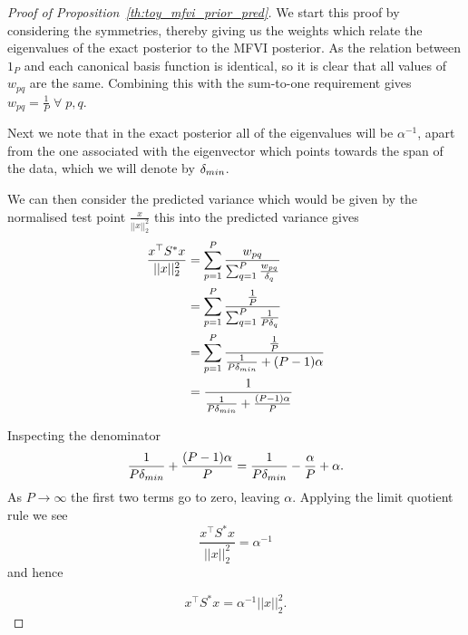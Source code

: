 \begin{proof}[Proof of Proposition~\ref{th:toy_mfvi_prior_pred}]
    
    We start this proof by considering the symmetries,  thereby giving us the weights which relate the eigenvalues of the exact posterior to the MFVI posterior. 
    As the relation between $1_P$ and each canonical basis function is identical, so it is clear that all values of $w_{pq}$ are the same. Combining this with the sum-to-one requirement gives $w_{pq} = \frac{1}{P} \; \forall \; p, q $. 

    Next we note that in the exact posterior all of the eigenvalues will be $\alpha^{-1}$, apart from the one associated with the eigenvector which points towards the span of the data, which we will denote by $\delta_{min}$. 

    We can then consider the predicted variance which would be given by the normalised test point $\frac{x}{||x||_2^2}$ this into the predicted variance gives  
    \begin{align}
        \frac{x^\top S^* x}{||x||_2^2} &= \sum_{p=1}^P \frac{w_{pq}}{\sum_{q=1}^P \frac{w_{pq}}{\delta_q}}
        \\ & = \sum_{p=1}^P \frac{\frac{1}{P}}{\sum_{q=1}^P \frac{1}{P \delta_q}}
        \\ & = \sum_{p=1}^P \frac{\frac{1}{P}}{\frac{1}{P \delta_{min}} + (P-1)\alpha}
        \\ & = \frac{1}{\frac{1}{P \delta_{min}} + \frac{(P-1)\alpha}{P}}
    \end{align}






    Inspecting the denominator 
    \begin{equation}
        \frac{1}{P \delta_{min}} + \frac{(P-1)\alpha}{P} = \frac{1}{P \delta_{min}} - \frac{\alpha}{P} + \alpha.
    \end{equation}
    As $P\to \infty$ the first two terms go to zero, leaving $\alpha$. Applying the limit quotient rule we see 
    \begin{equation}
        \frac{x^\top S^* x}{||x||_2^2} = \alpha^{-1}
    \end{equation}
and hence 
    
\begin{equation}
        x^\top  S^* x= \alpha^{-1} ||x||_2^2.
    \end{equation}
\end{proof}




